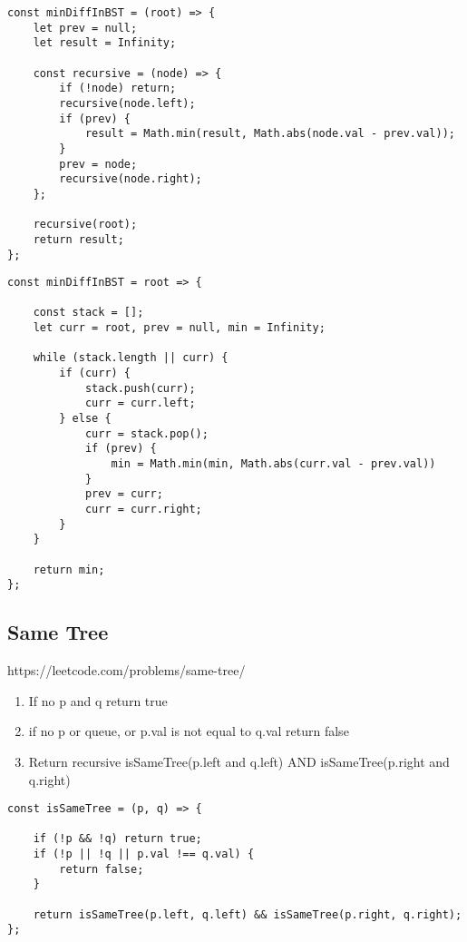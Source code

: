 \documentclass[10pt]{article}
\begin{document}
\begin{lstlisting}[title=Solution minDiffInBST, captionpos=t]
const minDiffInBST = (root) => {
    let prev = null;
    let result = Infinity;
    
    const recursive = (node) => {
        if (!node) return;
        recursive(node.left);
        if (prev) {
            result = Math.min(result, Math.abs(node.val - prev.val));
        }
        prev = node;
        recursive(node.right);
    };
    
    recursive(root);
    return result;
};
\end{lstlisting}


\begin{lstlisting}[title=Solution minDiffInBST Iterative, captionpos=t]
const minDiffInBST = root => {
    
    const stack = [];
    let curr = root, prev = null, min = Infinity;
    
    while (stack.length || curr) {
        if (curr) {
            stack.push(curr);
            curr = curr.left;
        } else {
            curr = stack.pop();
            if (prev) {
                min = Math.min(min, Math.abs(curr.val - prev.val))
            }
            prev = curr;		
            curr = curr.right;
        }
    }
    
    return min;
};\end{lstlisting}

\medskip %












\pagebreak
\medskip   
\subsection {Same Tree}
https://leetcode.com/problems/same-tree/

\begin{enumerate}
	\item If no p and q return true
	\item if no p or queue, or p.val is not equal to q.val return false
	\item Return recursive isSameTree(p.left and q.left) AND isSameTree(p.right and q.right)
\end{enumerate}

\begin{lstlisting}[title=Solution isSameTree, captionpos=t]
const isSameTree = (p, q) => {

    if (!p && !q) return true;
    if (!p || !q || p.val !== q.val) {
        return false;    
    }

    return isSameTree(p.left, q.left) && isSameTree(p.right, q.right);
};
\end{lstlisting}

\medskip %
\end{document}
